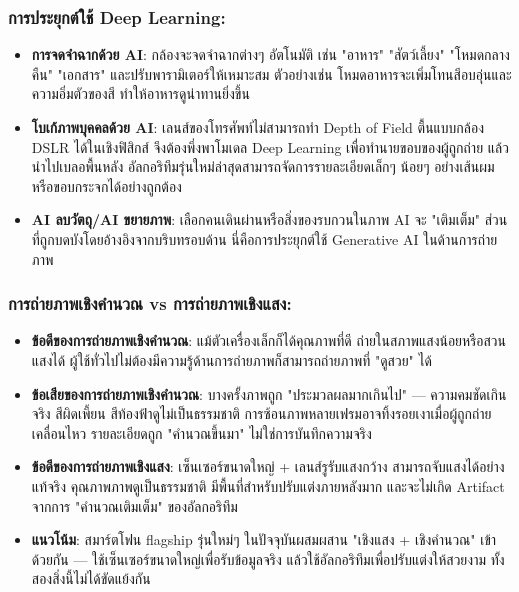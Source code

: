 \subsubsection*{การประยุกต์ใช้ Deep Learning:}

\begin{itemize}
  \item \textbf{การจดจำฉากด้วย AI}: กล้องจะจดจำฉากต่างๆ อัตโนมัติ เช่น "อาหาร" "สัตว์เลี้ยง" "โหมดกลางคืน" "เอกสาร" และปรับพารามิเตอร์ให้เหมาะสม ตัวอย่างเช่น โหมดอาหารจะเพิ่มโทนสีอบอุ่นและความอิ่มตัวของสี ทำให้อาหารดูน่าทานยิ่งขึ้น
  \item \textbf{โบเก้ภาพบุคคลด้วย AI}: เลนส์ของโทรศัพท์ไม่สามารถทำ Depth of Field ตื้นแบบกล้อง DSLR ได้ในเชิงฟิสิกส์ จึงต้องพึ่งพาโมเดล Deep Learning เพื่อทำนายขอบของผู้ถูกถ่าย แล้วนำไปเบลอพื้นหลัง อัลกอริทึมรุ่นใหม่ล่าสุดสามารถจัดการรายละเอียดเล็กๆ น้อยๆ อย่างเส้นผมหรือขอบกระจกได้อย่างถูกต้อง
  \item \textbf{AI ลบวัตถุ/AI ขยายภาพ}: เลือกคนเดินผ่านหรือสิ่งของรบกวนในภาพ AI จะ "เติมเต็ม" ส่วนที่ถูกบดบังโดยอ้างอิงจากบริบทรอบด้าน นี่คือการประยุกต์ใช้ Generative AI ในด้านการถ่ายภาพ
\end{itemize}

\subsubsection*{การถ่ายภาพเชิงคำนวณ vs การถ่ายภาพเชิงแสง:}

\begin{itemize}
  \item \textbf{ข้อดีของการถ่ายภาพเชิงคำนวณ}: แม้ตัวเครื่องเล็กก็ได้คุณภาพที่ดี ถ่ายในสภาพแสงน้อยหรือสวนแสงได้ ผู้ใช้ทั่วไปไม่ต้องมีความรู้ด้านการถ่ายภาพก็สามารถถ่ายภาพที่ "ดูสวย" ได้
  \item \textbf{ข้อเสียของการถ่ายภาพเชิงคำนวณ}: บางครั้งภาพถูก "ประมวลผลมากเกินไป" — ความคมชัดเกินจริง สีผิดเพี้ยน สีท้องฟ้าดูไม่เป็นธรรมชาติ การซ้อนภาพหลายเฟรมอาจทิ้งรอยเงาเมื่อผู้ถูกถ่ายเคลื่อนไหว รายละเอียดถูก "คำนวณขึ้นมา" ไม่ใช่การบันทึกความจริง
  \item \textbf{ข้อดีของการถ่ายภาพเชิงแสง}: เซ็นเซอร์ขนาดใหญ่ + เลนส์รูรับแสงกว้าง สามารถจับแสงได้อย่างแท้จริง คุณภาพภาพดูเป็นธรรมชาติ มีพื้นที่สำหรับปรับแต่งภายหลังมาก และจะไม่เกิด Artifact จากการ "คำนวณเติมเต็ม" ของอัลกอริทึม
  \item \textbf{แนวโน้ม}: สมาร์ตโฟน flagship รุ่นใหม่ๆ ในปัจจุบันผสมผสาน "เชิงแสง + เชิงคำนวณ" เข้าด้วยกัน — ใช้เซ็นเซอร์ขนาดใหญ่เพื่อรับข้อมูลจริง แล้วใช้อัลกอริทึมเพื่อปรับแต่งให้สวยงาม ทั้งสองสิ่งนี้ไม่ได้ขัดแย้งกัน
\end{itemize}

